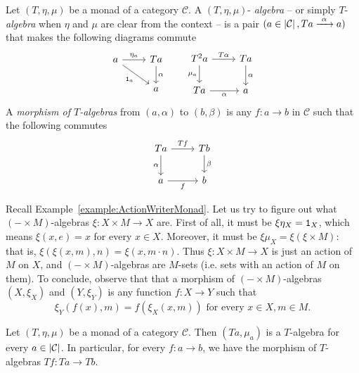 \begin{definition}
  Let \((T, \eta, \mu)\) be a monad of a category \(\mathcal{C}\). A \((T, \eta, \mu)\)-{\em
    algebra} -- or simply \(T\)-{\em algebra} when \(\eta\) and \(\mu\) are
  clear from the context -- is a pair \((a \in \left\lvert\mathcal{C}\right\rvert, Ta \xrightarrow{\ \alpha\ } a)\)
  that makes the following diagrams commute
  \[
    \begin{tikzcd}
      a \ar["{\eta_a}", r] \ar["{\id_a}", dr, swap] & Ta \ar["{\alpha}", d] \\
      & a
    \end{tikzcd}
    \qquad
    \begin{tikzcd}
      T^2a \ar["{\mu_a}", d, swap] \ar["{T\alpha}", r] & Ta \ar["{\alpha}", d] \\
      Ta \ar["{\alpha}", r, swap] & a
    \end{tikzcd}
  \]
  A {\em morphism of \(T\)-algebras} from \((a, \alpha)\) to \((b, \beta)\) is any \(f
  : a \to b\) in \(\mathcal{C}\) such that the following commutes
  \[
    \begin{tikzcd}
      Ta \ar["{\alpha}", d, swap] \ar["{Tf}", r] & Tb \ar["{\beta}", d] \\
      a \ar["{f}", r, swap] & b
    \end{tikzcd}
  \]
\end{definition}

\begin{example}
  Recall Example~\ref{example:ActionWriterMonad}. Let us try to figure
  out what \((- \times M)\)-algebras \(\xi : X \times M \to X\) are. First of all, it
  must be \(\xi \eta_X = \mathtt 1_X\), which means \(\xi(x, e) = x\) for every \(x \in
  X\). Moreover, it must be \(\xi \mu_X = \xi (\xi \times M)\): that is, \(\xi(\xi(x, m),
  n) = \xi(x, m \cdot n)\). Thus \(\xi : X \times M \to X\) is just an action of \(M\)
  on \(X\), and \((- \times M)\)-algebras are \(M\)-sets (i.e. sets with an
  action of \(M\) on them). To conclude, observe that that a morphism of
  \((- \times M)\)-algebras \((X, \xi_X)\) and \((Y, \xi_Y)\) is any function \(f :
  X \to Y\) such that
  \[
    \xi_Y (f(x), m) = f\left(\xi_X(x, m)\right) \text{ for every } x \in X, m
      \in M .
  \]
\end{example}

\begin{lemma}
  Let \((T, \eta, \mu)\) be a monad of a category \(\mathcal{C}\). Then \((Ta, \mu_a)\)
  is a \(T\)-algebra for every \(a \in \left\lvert\mathcal{C}\right\rvert\). In particular, for every
  \(f : a \to b\), we have the morphism of \(T\)-algebras \(Tf : Ta \to Tb\).
\end{lemma}

